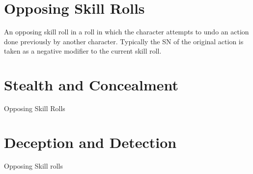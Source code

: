 \section{Opposing Skill Rolls}

An opposing skill roll in a roll in which the character attempts to 
undo an action done previously by another character. Typically the SN 
of the original action is taken as a negative modifier to the current 
skill roll.

\section{Stealth and Concealment}

Opposing Skill Rolls

\section{Deception and Detection}

Opposing Skill rolls



